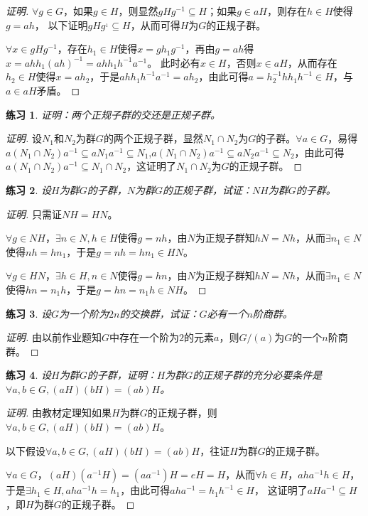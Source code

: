 \documentclass{article}
\newtheorem{Exercise}{练习}
\begin{document}
\begin{CJK*}{UTF8}{gbsn}
\begin{proof}[证明]
  $\forall g\in G$，如果$g\in H$，则显然$gHg^{-1}\subseteq H$；如果$g\in aH$，则存在$h\in H$使得$g=ah$，
  以下证明$gHg^{_1}\subseteq H$，从而可得$H$为$G$的正规子群。

  $\forall x\in gHg^{-1}$，存在$h_1\in H$使得$x=gh_1g^{-1}$，再由$g=ah$得$x=ahh_1(ah)^{-1}=ahh_1h^{-1}a^{-1}$。
  此时必有$x\in H$，否则$x\in aH$，从而存在$h_2\in H$使得$x=ah_2$，于是$ahh_1h^{-1}a^{-1}=ah_2$，由此可得$a=h_2^{-1}hh_1h^{-1}\in H$，与$a\in aH$矛盾。
\end{proof}
\begin{Exercise}
证明：两个正规子群的交还是正规子群。
\end{Exercise}
\begin{proof}[证明]
  设$N_1$和$N_2$为群$G$的两个正规子群，显然$N_1\cap N_2$为$G$的子群。$\forall a\in G$，易得$a(N_1\cap N_2)a^{-1}\subseteq aN_1a^{-1}\subseteq N_1$,$a(N_1\cap N_2)a^{-1}\subseteq aN_2a^{-1}\subseteq N_2$，由此可得$a(N_1\cap N_2)a^{-1}\subseteq N_1\cap N_2$，这证明了$N_1\cap N_2$为$G$的正规子群。
\end{proof}
\begin{Exercise}
设$H$为群$G$的子群，$N$为群$G$的正规子群，试证：$NH$为群$G$的子群。
\end{Exercise}
\begin{proof}[证明]
  只需证$NH=HN$。

  $\forall g \in NH$，$\exists n\in N, h\in H$使得$g=nh$，由$N$为正规子群知$hN=Nh$，从而$\exists n_1\in N$使得$nh=hn_1$，于是$g=nh=hn_1\in HN$。

  $\forall g \in HN$，$\exists h\in H, n\in N$使得$g=hn$，由$N$为正规子群知$hN=Nh$，从而$\exists n_1\in N$使得$hn=n_1h$，于是$g=hn=n_1h\in NH$。
\end{proof}
\begin{Exercise}
设$G$为一个阶为$2n$的交换群，试证：$G$必有一个$n$阶商群。
\end{Exercise}
\begin{proof}[证明]
  由以前作业题知$G$中存在一个阶为$2$的元素$a$，则$G/(a)$为$G$的一个$n$阶商群。
\end{proof}
\begin{Exercise}
设$H$为群$G$的子群，证明：$H$为群$G$的正规子群的充分必要条件是$\forall a,b\in G,(aH)(bH)=(ab)H$。
\end{Exercise}

\begin{proof}[证明]
  由教材定理知如果$H$为群$G$的正规子群，则$\forall a,b\in G,(aH)(bH)=(ab)H$。

  以下假设$\forall a,b\in G,(aH)(bH)=(ab)H$，往证$H$为群$G$的正规子群。

  $\forall a\in G$，$(aH)(a^{-1}H)=(aa^{-1})H=eH=H$，从而$\forall h\in H$，$aha^{-1}h\in H$，于是$\exists h_1\in H, aha^{-1}h=h_1$，由此可得$aha^{-1}=h_1h^{-1}\in H$，
  这证明了$aHa^{-1}\subseteq H$，即$H$为群$G$的正规子群。
\end{proof}
\end{CJK*}
\end{document}
